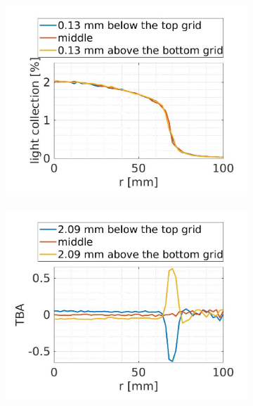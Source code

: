 \begin{figure}[!p]
	\begin{subfigure}[b]{\halfwidth}
	\centering
	\includegraphics[width=\textwidth,clip,trim={0 30 0 195}]{Figures/GasTest/LGresult/PDEvsRadiusPTFE040MiddleTopBottomconfig2.jpg}
	\caption{}
	\label{fig:}
\end{subfigure}
\begin{subfigure}[b]{\halfwidth}
	\centering
	\includegraphics[width=\textwidth,clip,trim={0 30 0 200}]{Figures/GasTest/LGresult/PDEvsRadiusPTFE040MiddleTopBottomTBAFullconfig2.jpg}%
	\caption{}
	\label{fig:}
\end{subfigure}


\end{figure}
